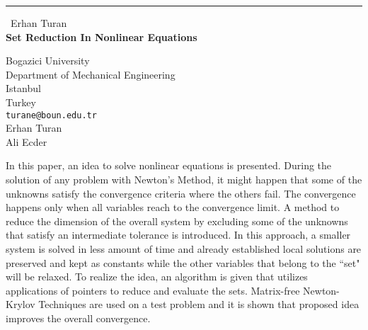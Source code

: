 \documentclass{report}
\begin{document}
\begin{center}
\rule{6in}{1pt} \
{\large Erhan Turan \\
{\bf Set Reduction In Nonlinear Equations}}

Bogazici University \\ Department of Mechanical Engineering \\ Istanbul \\ Turkey
\\
{\tt turane@boun.edu.tr}\\
Erhan Turan\\
Ali Ecder\end{center}

In this paper, an idea to solve nonlinear equations is presented. During
the solution of any problem with Newton's Method, it might happen that
some of the unknowns satisfy the convergence criteria where the others
fail. The convergence happens only when all variables reach to the
convergence limit. A method to reduce the dimension of the overall system
by excluding some of the unknowns that satisfy an intermediate tolerance
is introduced. In this approach, a smaller system is solved in less
amount of time and already established local solutions are preserved and
kept as constants while the other variables that belong to the ``set"
will be relaxed. To realize the idea, an algorithm is given that utilizes
applications of pointers to reduce and evaluate the sets. Matrix-free
Newton-Krylov Techniques are used on a test problem and it is shown that
proposed idea improves the overall convergence.
\end{document}
